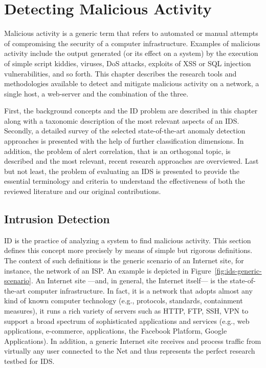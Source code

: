 \chapter{Detecting Malicious Activity}
\label{detection}
Malicious activity is a generic term that refers to automated or
manual attempts of compromising the security of a computer
infrastructure. Examples of malicious activity include the output
generated (or its effect on a system) by the execution of simple
script kiddies, viruses, \ac{DoS} attacks, exploits of \ac{XSS} or
\ac{SQL} injection vulnerabilities, and so forth. This chapter
describes the research tools and methodologies available to detect and
mitigate malicious activity on a network, a single host, a web-server
and the combination of the three.

First, the background concepts and the \ac{ID} problem are described
in this chapter along with a taxonomic description of the most
relevant aspects of an \ac{IDS}. Secondly, a detailed survey of the
selected state-of-the-art anomaly detection approaches is presented
with the help of further classification dimensions. In addition, the
problem of alert correlation, that is an orthogonal topic, is
described and the most relevant, recent research approaches are
overviewed. Last but not least, the problem of evaluating an \ac{IDS}
is presented to provide the essential terminology and criteria to
understand the effectiveness of both the reviewed literature and our
original contributions.

\section{Intrusion Detection}
\label{detection:id}
\ac{ID} is the practice of analyzing a system to find malicious
activity. This section defines this concept more precisely by means of
simple but rigorous definitions. The context of such definitions is
the generic scenario of an Internet site, for instance, the network of
an \ac{ISP}. An example is depicted in
Figure~\ref{fig:ids-generic-scenario}. An Internet site ---and, in
general, the Internet itself--- is the state-of-the-art computer
infrastructure. In fact, it is a network that adopts almost any kind
of known computer technology (e.g., protocols, standards, containment
measures), it runs a rich variety of servers such as
\ac{HTTP}, \ac{FTP}, \ac{SSH},
\ac{VPN} to support a broad spectrum of sophisticated
applications and services (e.g., web applications, e-commerce,
applications, the \textsf{Facebook Platform}, \textsf{Google
  Applications}). In addition, a generic Internet site receives and
process traffic from virtually any user connected to the Net and thus
represents the perfect research testbed for \ac{IDS}.

